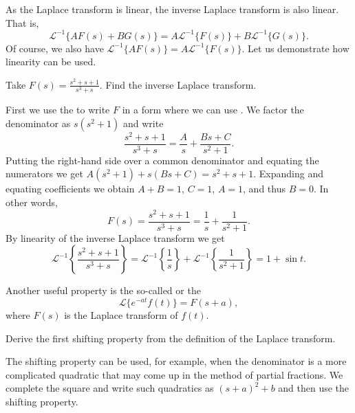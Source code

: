 As the Laplace transform is linear, the inverse Laplace
transform is also linear.  That is,
\begin{equation*}
{\mathcal{L}}^{-1} \bigl\{ A F(s) + B G(s) \bigr\} =
A {\mathcal{L}}^{-1} \bigl\{ F(s) \bigr\} +
B {\mathcal{L}}^{-1} \bigl\{ G(s) \bigr\} .
\end{equation*}
Of course, we also have
${\mathcal{L}}^{-1} \bigl\{ A F(s) \bigr\} =
A {\mathcal{L}}^{-1} \bigl\{ F(s) \bigr\}$.
Let us demonstrate how linearity can be used.

\begin{example}
Take
$F(s) = \frac{s^2+s+1}{s^3+s}$.  Find the inverse Laplace transform.

First we use the \emph{} to write $F$ in a form where
we can use .  We factor the denominator as
$s(s^2+1)$ and write
\begin{equation*}
\frac{s^2+s+1}{s^3+s}
=
\frac{A}{s} + 
\frac{Bs+C}{s^2+1} .
\end{equation*}
Putting the right-hand side over a common
denominator and equating the numerators we get
$A(s^2+1) + s(Bs+C) = s^2+s+1$.  Expanding and equating coefficients
we obtain $A+B = 1$, $C=1$, $A=1$,
and thus $B=0$.  In
other words,
\begin{equation*}
F(s) =
\frac{s^2+s+1}{s^3+s}
=
\frac{1}{s} +
\frac{1}{s^2+1} .
\end{equation*}
By linearity of the inverse Laplace transform we get 
\begin{equation*}
{\mathcal{L}}^{-1} \left\{ 
\frac{s^2+s+1}{s^3+s} \right\}
=
{\mathcal{L}}^{-1} \left\{ 
\frac{1}{s} \right\} 
+
{\mathcal{L}}^{-1} \left\{ 
\frac{1}{s^2+1} \right\}
=
1 + 
\sin t .
\end{equation*}
\end{example}

Another useful property is the 
so-called \emph{} or
the \emph{}
\begin{equation*}
\boxed{~~
\mathcal{L} \bigl\{ e^{-at} f(t) \bigr\} = F(s+a) ,
~~}
\end{equation*}
where $F(s)$ is the Laplace transform of $f(t)$.

\begin{exercise}
Derive the first shifting property
from the definition of the Laplace transform.
\end{exercise}

The shifting property can be used, for example, when the denominator is a
more complicated quadratic that may come up in the method of partial
fractions.  We complete the square and write such quadratics as ${(s+a)}^2+b$
and then use the shifting property.

